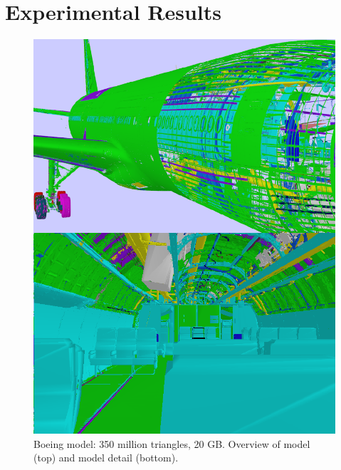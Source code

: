 
\section{Experimental Results}

\begin{figure}[h!]
  \centering
  \includegraphics[width=\columnwidth]{BoeingModel.pdf}
  \caption{Boeing model: 350 million triangles, 20 GB. Overview of model (top)
and model detail (bottom).}
  \label{fig:model2}
\end{figure}


